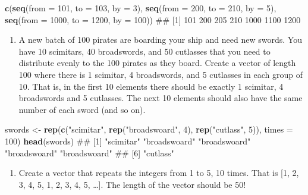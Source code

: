 \documentclass[]{book}
\newenvironment{Shaded}{\begin{snugshade}}{\end{snugshade}}
\newcommand{\KeywordTok}[1]{\textcolor[rgb]{0.13,0.29,0.53}{\textbf{{#1}}}}
\newcommand{\DataTypeTok}[1]{\textcolor[rgb]{0.13,0.29,0.53}{{#1}}}
\newcommand{\DecValTok}[1]{\textcolor[rgb]{0.00,0.00,0.81}{{#1}}}
\newcommand{\StringTok}[1]{\textcolor[rgb]{0.31,0.60,0.02}{{#1}}}
\newcommand{\NormalTok}[1]{{#1}}
\providecommand{\tightlist}{%
  \setlength{\itemsep}{0pt}\setlength{\parskip}{0pt}}
\theoremstyle{definition}
\theoremstyle{definition}
\theoremstyle{remark}
\begin{document}
\begin{Shaded}
\begin{Highlighting}[]
\KeywordTok{c}\NormalTok{(}\KeywordTok{seq}\NormalTok{(}\DataTypeTok{from =} \DecValTok{101}\NormalTok{, }\DataTypeTok{to =} \DecValTok{103}\NormalTok{, }\DataTypeTok{by =} \DecValTok{3}\NormalTok{), }
  \KeywordTok{seq}\NormalTok{(}\DataTypeTok{from =} \DecValTok{200}\NormalTok{, }\DataTypeTok{to =} \DecValTok{210}\NormalTok{, }\DataTypeTok{by =} \DecValTok{5}\NormalTok{), }
  \KeywordTok{seq}\NormalTok{(}\DataTypeTok{from =} \DecValTok{1000}\NormalTok{, }\DataTypeTok{to =} \DecValTok{1200}\NormalTok{, }\DataTypeTok{by =} \DecValTok{100}\NormalTok{))}
\NormalTok{## [1]  101  200  205  210 1000 1100 1200}
\end{Highlighting}
\end{Shaded}

\begin{enumerate}
\def\labelenumi{\arabic{enumi}.}
\setcounter{enumi}{4}
\tightlist
\item
  A new batch of 100 pirates are boarding your ship and need new swords.
  You have 10 scimitars, 40 broadswords, and 50 cutlasses that you need
  to distribute evenly to the 100 pirates as they board. Create a vector
  of length 100 where there is 1 scimitar, 4 broadswords, and 5
  cutlasses in each group of 10. That is, in the first 10 elements there
  should be exactly 1 scimitar, 4 broadswords and 5 cutlasses. The next
  10 elements should also have the same number of each sword (and so
  on).
\end{enumerate}

\begin{Shaded}
\begin{Highlighting}[]
\NormalTok{swords <-}\StringTok{ }\KeywordTok{rep}\NormalTok{(}\KeywordTok{c}\NormalTok{(}\StringTok{"scimitar"}\NormalTok{, }\KeywordTok{rep}\NormalTok{(}\StringTok{"broadswoard"}\NormalTok{, }\DecValTok{4}\NormalTok{), }\KeywordTok{rep}\NormalTok{(}\StringTok{"cutlass"}\NormalTok{, }\DecValTok{5}\NormalTok{)), }\DataTypeTok{times =} \DecValTok{100}\NormalTok{)}
\KeywordTok{head}\NormalTok{(swords)}
\NormalTok{## [1] "scimitar"    "broadswoard" "broadswoard" "broadswoard" "broadswoard"}
\NormalTok{## [6] "cutlass"}
\end{Highlighting}
\end{Shaded}

\begin{enumerate}
\def\labelenumi{\arabic{enumi}.}
\setcounter{enumi}{5}
\tightlist
\item
  Create a vector that repeats the integers from 1 to 5, 10 times. That
  is {[}1, 2, 3, 4, 5, 1, 2, 3, 4, 5, \ldots{}{]}. The length of the
  vector should be 50!
\end{enumerate}
\end{document}
